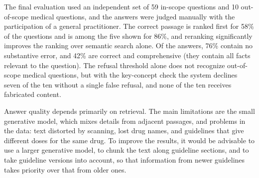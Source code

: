 \documentclass[12pt,a4paper]{article}
\begin{document}
The final evaluation used an independent set of 59 in-scope questions and 10 out-of-scope medical questions, and the answers were judged manually with the participation of a general practitioner. The correct passage is ranked first for 58\% of the questions and is among the five shown for 86\%, and reranking significantly improves the ranking over semantic search alone. Of the answers, 76\% contain no substantive error, and 42\% are correct and comprehensive (they contain all facts relevant to the question). The refusal threshold alone does not recognize out-of-scope medical questions, but with the key-concept check the system declines seven of the ten without a single false refusal, and none of the ten receives fabricated content.

Answer quality depends primarily on retrieval. The main limitations are the small generative model, which mixes details from adjacent passages, and problems in the data: text distorted by scanning, lost drug names, and guidelines that give different doses for the same drug. To improve the results, it would be advisable to use a larger generative model, to chunk the text along guideline sections, and to take guideline versions into account, so that information from newer guidelines takes priority over that from older ones.
\end{document}
